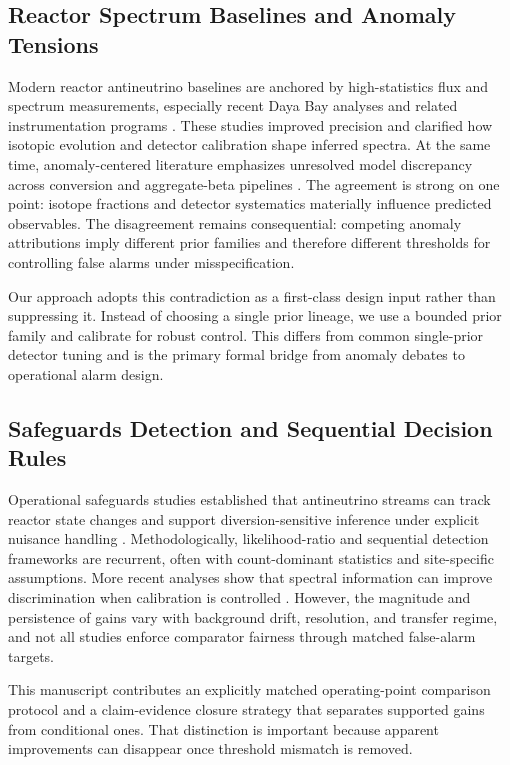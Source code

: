 \subsection{Reactor Spectrum Baselines and Anomaly Tensions}
Modern reactor antineutrino baselines are anchored by high-statistics flux and spectrum measurements, especially recent Daya Bay analyses and related instrumentation programs \citep{SRC002,SRC003,SRC012,SRC013,SRC014}. These studies improved precision and clarified how isotopic evolution and detector calibration shape inferred spectra. At the same time, anomaly-centered literature emphasizes unresolved model discrepancy across conversion and aggregate-beta pipelines \citep{SRC005,SRC015,SRC029,SRC030,SRC031}. The agreement is strong on one point: isotope fractions and detector systematics materially influence predicted observables. The disagreement remains consequential: competing anomaly attributions imply different prior families and therefore different thresholds for controlling false alarms under misspecification.

Our approach adopts this contradiction as a first-class design input rather than suppressing it. Instead of choosing a single prior lineage, we use a bounded prior family and calibrate for robust control. This differs from common single-prior detector tuning and is the primary formal bridge from anomaly debates to operational alarm design.

\subsection{Safeguards Detection and Sequential Decision Rules}
Operational safeguards studies established that antineutrino streams can track reactor state changes and support diversion-sensitive inference under explicit nuisance handling \citep{SRC035,SRC034,SRC023,SRC022,SRC018,SRC017,SRC011,SRC009,SRC001}. Methodologically, likelihood-ratio and sequential detection frameworks are recurrent, often with count-dominant statistics and site-specific assumptions. More recent analyses show that spectral information can improve discrimination when calibration is controlled \citep{SRC009,SRC017,SRC023}. However, the magnitude and persistence of gains vary with background drift, resolution, and transfer regime, and not all studies enforce comparator fairness through matched false-alarm targets.

This manuscript contributes an explicitly matched operating-point comparison protocol and a claim-evidence closure strategy that separates supported gains from conditional ones. That distinction is important because apparent improvements can disappear once threshold mismatch is removed.

